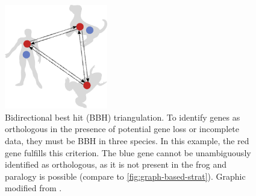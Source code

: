 \begin{figure}[t]
	\centering
	\includegraphics[width=0.4\textwidth]{img/triangulation-bbh.pdf}
	\caption[Bidirectional best hit (BBH) triangulation]{
		Bidirectional best hit (BBH) triangulation. To identify genes as orthologous
		in the presence of potential gene loss or incomplete data, they must be BBH
		in three species.  In this example, the red gene fulfills this criterion.
		The blue gene cannot be unambiguously identified as orthologous, as it is
		not present in the frog and paralogy is possible (compare to
		\autoref{fig:graph-based-strat}).  Graphic modified from
		\citet{altenhoff2012}.
	}
	\label{fig:triangulation-bbh}
\end{figure}
